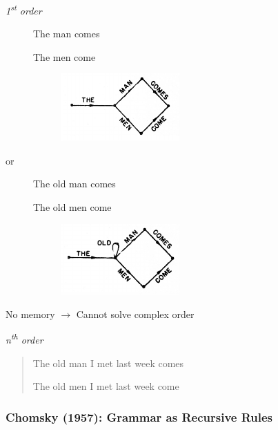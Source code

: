 \documentclass[a4paper, openany]{book}
\begin{document}
\emph{1\textsuperscript{st} order}

\begin{figure}[htbp]
  \centering

  \parbox[t]{0.29\textwidth}{The man comes

    The men come}
  \begin{subfigure}{0.39\textwidth}
    \raggedright
    \includegraphics[width=0.5\textwidth]{assets/MarkovGrammar1.png}
  \end{subfigure}
\end{figure}

or

\begin{figure}[htbp]
  \centering
  \parbox[t]{0.29\textwidth}{The old man comes

    The old men come}
  \begin{subfigure}{0.39\textwidth}
    \raggedright
    \includegraphics[width=0.5\textwidth]{assets/MarkovGrammar2.png}
  \end{subfigure}
\end{figure}

No memory $\rightarrow$ Cannot solve complex order

\emph{n\textsuperscript{th} order}

\begin{quotation}
  The old man I met last week comes

  The old men I met last week come
\end{quotation}

\subsubsection{Chomsky (1957): Grammar as Recursive
Rules}
\end{document}
